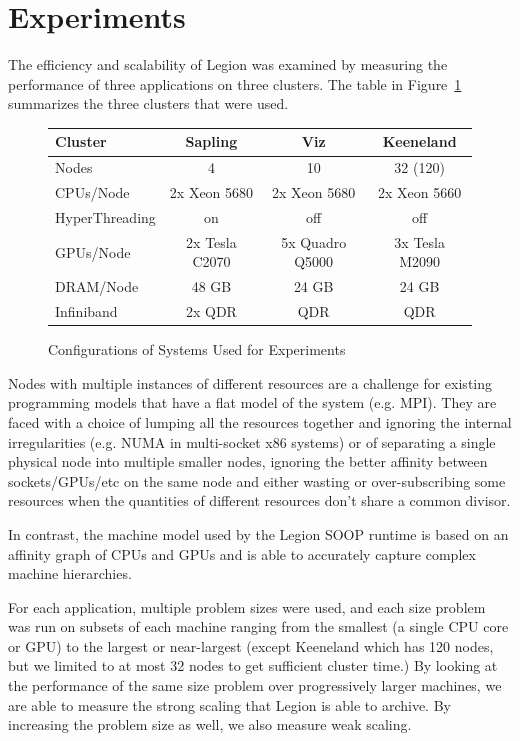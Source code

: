\section{Experiments}
\label{sec:exp}

The efficiency and scalability of Legion was examined by measuring the performance
of three applications on three clusters.  The table in Figure~\ref{fig:systems} summarizes 
the three clusters that were used.

\begin{figure}
{\footnotesize
\begin{tabular}{l|ccc}
Cluster & Sapling & Viz & Keeneland \\
\midrule
Nodes   &   4     &  10 &  32 (120) \\
CPUs/Node & 2x Xeon 5680 & 2x Xeon 5680 & 2x Xeon 5660 \\
HyperThreading & on & off & off \\
GPUs/Node & 2x Tesla C2070 & 5x Quadro Q5000 & 3x Tesla M2090 \\
DRAM/Node & 48 GB & 24 GB & 24 GB \\
Infiniband & 2x QDR & QDR & QDR \\
\end{tabular}
}

\caption{Configurations of Systems Used for Experiments \label{fig:systems}}
\end{figure}

Nodes with multiple instances of different resources are a challenge for 
existing programming models that have a flat model of the system (e.g. MPI).
They are faced with a choice of lumping all 
the resources together and ignoring the internal irregularities (e.g. NUMA
in multi-socket x86 systems) or of separating a single physical node into
multiple smaller nodes, ignoring the better affinity between sockets/GPUs/etc
on the same node and either wasting or over-subscribing some resources when
the quantities of different resources don't share a common divisor.

In contrast, the machine model used by the Legion SOOP runtime is based on an
affinity graph of CPUs and GPUs and is able to accurately capture complex
machine hierarchies.

For each application, multiple problem sizes were used, and each size problem was
run on subsets of each machine ranging from the smallest (a single CPU core or GPU)
to the largest or near-largest (except Keeneland which has 120 nodes, but we limited 
to at most 32 nodes to get sufficient cluster time.)
By looking at the performance of the same size problem over progressively larger
machines, we are able to measure the strong scaling that Legion is able to
archive.  By increasing the problem size as well, we also measure weak scaling.

